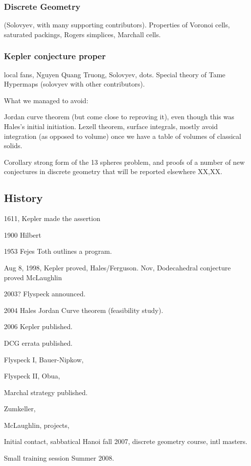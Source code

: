 \documentclass{llncs}
\begin{document}
\subsubsection{Discrete Geometry} (Solovyev, with many supporting contributors).  Properties
of Voronoi cells, saturated packings, Rogers simplices, Marchall cells.

\subsubsection{Kepler conjecture proper}  local fans, Nguyen Quang Truong, Solovyev, dots.
Special theory of Tame Hypermaps (solovyev with other contributors).

What we managed to avoid:

Jordan curve theorem (but come close to reproving it), even though this was
Hales's initial initiation. Lexell theorem, 
surface integrals, mostly avoid integration (as opposed to volume) 
once we have a table of
volumes of classical solids.

Corollary strong form of the 13 spheres problem, and proofs of a number
of new conjectures in discrete geometry that will be reported elsewhere XX,XX.




\subsection{History}

1611, Kepler made the assertion

1900 Hilbert

1953 Fejes Toth outlines  a program.

Aug 8, 1998, Kepler proved, Hales/Ferguson.
Nov, Dodecahedral conjecture proved McLaughlin

2003? Flyspeck announced.

2004 Hales Jordan Curve theorem (feasibility study).

2006 Kepler published.

DCG errata published.

Flyspeck I, Bauer-Nipkow,

Flyspeck II, Obua,

Marchal strategy published.

Zumkeller,

McLaughlin, projects, 


Initial contact, sabbatical Hanoi fall 2007, discrete geometry course, intl masters.

Small training session Summer 2008.
\end{document}
